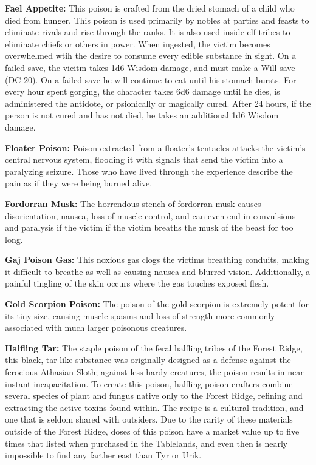 \textbf{Fael Appetite:} This poison is crafted from the dried stomach of a child who died from hunger. This poison is used primarily by nobles at parties and feasts to eliminate rivals and rise through the ranks. It is also used inside elf tribes to eliminate chiefs or others in power. When ingested, the victim becomes overwhelmed wtih the desire to consume every edible substance in sight. On a failed save, the vicitm takes 1d6 Wisdom damage, and must make a Will save (DC 20). On a failed save he will continue to eat until his stomach bursts. For every hour spent gorging, the character takes 6d6 damage until he dies, is administered the antidote, or psionically or magically cured. After 24 hours, if the person is not cured and has not died, he takes an additional 1d6 Wisdom damage.

\textbf{Floater Poison:} Poison extracted from a floater's tentacles attacks the victim's central nervous system, flooding it with signals that send the victim into a paralyzing seizure. Those who have lived through the experience describe the pain as if they were being burned alive.

\textbf{Fordorran Musk:} The horrendous stench of fordorran musk causes disorientation, nausea, loss of muscle control, and can even end in convulsions and paralysis if the victim if the victim breaths the musk of the beast for too long. 

\textbf{Gaj Poison Gas:} This noxious gas clogs the victims breathing conduits, making it difficult to breathe as well as causing nausea and blurred vision. Additionally, a painful tingling of the skin occurs where the gas touches exposed flesh.

\textbf{Gold Scorpion Poison:} The poison of the gold scorpion is extremely potent for its tiny size, causing muscle spasms and loss of strength more commonly associated with much larger poisonous creatures.

\textbf{Halfling Tar:} The staple poison of the feral halfling tribes of the Forest Ridge, this black, tar-like substance was originally designed as a defense against the ferocious Athasian Sloth; against less hardy creatures, the poison results in near-instant incapacitation. To create this poison, halfling poison crafters combine several species of plant and fungus native only to the Forest Ridge, refining and extracting the active toxins found within. The recipe is a cultural tradition, and one that is seldom shared with outsiders. Due to the rarity of these materials outside of the Forest Ridge, doses of this poison have a market value up to five times that listed when purchased in the Tablelands, and even then is nearly impossible to find any farther east than Tyr or Urik.

